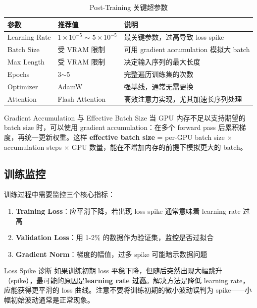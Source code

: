 \documentclass[a4paper]{article}
\begin{document}
\begin{table}[H]
\centering
\caption{Post-Training 关键超参数}
\begin{tabular}{lll}
\toprule
\textbf{参数} & \textbf{推荐值} & \textbf{说明} \\
\midrule
Learning Rate & $1 \times 10^{-5}$ $\sim$ $5 \times 10^{-5}$ & 最关键参数，过高导致 loss spike \\
Batch Size & 受 VRAM 限制 & 可用 gradient accumulation 模拟大 batch \\
Max Length & 受 VRAM 限制 & 决定输入序列的最大长度 \\
Epochs & 3$\sim$5 & 完整遍历训练集的次数 \\
Optimizer & AdamW & 强基线，通常无需更换 \\
Attention & Flash Attention & 高效注意力实现，尤其加速长序列处理 \\
\bottomrule
\end{tabular}
\end{table}

\begin{knowledgebox}{Gradient Accumulation 与 Effective Batch Size}
当 GPU 内存不足以支持期望的 batch size 时，可以使用 gradient accumulation：在多个 forward pass 后累积梯度，再统一更新权重。这样 \textbf{effective batch size} = per-GPU batch size $\times$ accumulation steps $\times$ GPU 数量，能在不增加内存的前提下模拟更大的 batch。
\end{knowledgebox}

\subsection{训练监控}

训练过程中需要监控三个核心指标：

\begin{enumerate}
    \item \textbf{Training Loss}：应平滑下降，若出现 loss spike 通常意味着 learning rate 过高
    \item \textbf{Validation Loss}：用 1-2\% 的数据作为验证集，监控是否过拟合
    \item \textbf{Gradient Norm}：梯度的幅值，过多 spike 可能暗示数据问题
\end{enumerate}

\begin{warningbox}{Loss Spike 诊断}
如果训练初期 loss 平稳下降，但随后突然出现大幅跳升（spike），最可能的原因是\textbf{learning rate 过高}。解决方法是降低 learning rate，应能获得更平滑的 loss 曲线。注意不要将训练初期的微小波动误判为 spike——小幅初始波动通常是正常现象。
\end{warningbox}
\end{document}

